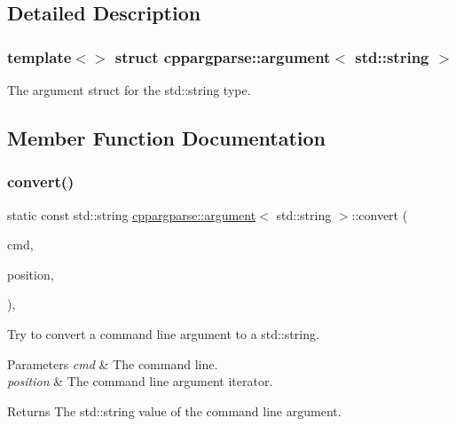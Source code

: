 \subsection{Detailed Description}
\subsubsection*{template$<$$>$\newline
struct cppargparse\+::argument$<$ std\+::string $>$}

The argument struct for the std\+::string type. 

\subsection{Member Function Documentation}
\mbox{\label{structcppargparse_1_1argument_3_01std_1_1string_01_4_aa54c1d7414d89a1071bb7cdb07be0b00}} 
\subsubsection{\texorpdfstring{convert()}{convert()}}
{\footnotesize\ttfamily static const std\+::string \hyperlink{structcppargparse_1_1argument}{cppargparse\+::argument}$<$ std\+::string $>$\+::convert (\begin{DoxyParamCaption}\item[{const \hyperlink{types_8h_a80adf2418b7ce9fe616698efa7533ecf}{types\+::\+Command\+Line\+\_\+t} \&}]{cmd,  }\item[{const \hyperlink{types_8h_a43b4f43f8940de1bf09ced6f1b668053}{types\+::\+Command\+Line\+Position\+\_\+t} \&}]{position,  }\item[{const \hyperlink{types_8h_a003c660afe2ee9c6cc39aea966e8926d}{types\+::\+Command\+Line\+Arguments\+\_\+t} \&}]{ }\end{DoxyParamCaption})\hspace{0.3cm}{\ttfamily [inline]}, {\ttfamily [static]}}



Try to convert a command line argument to a std\+::string. 


\begin{DoxyParams}{Parameters}
{\em cmd} & The command line. \\
\hline
{\em position} & The command line argument iterator.\\
\hline
\end{DoxyParams}
\begin{DoxyReturn}{Returns}
The std\+::string value of the command line argument. 
\end{DoxyReturn}

